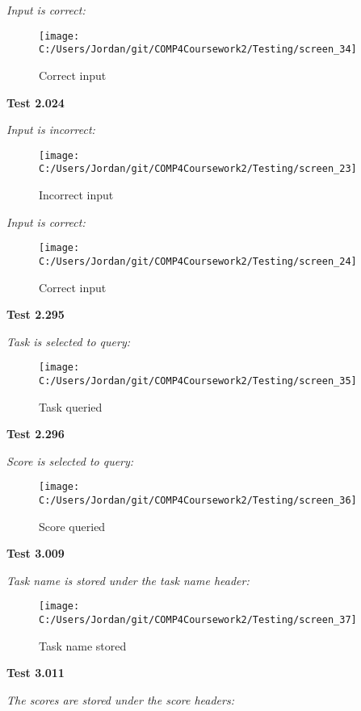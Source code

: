 \textit{Input is correct: }

\begin{figure}[H]
    \label{fig: Second Screen}\caption{Correct input}
    \texttt{[image: C:/Users/Jordan/git/COMP4Coursework2/Testing/screen\_34]}
\end{figure}

\textbf{Test 2.024}

\textit{Input is incorrect: }

\begin{figure}[H]
    \label{fig: Second Screen}\caption{Incorrect input}
    \texttt{[image: C:/Users/Jordan/git/COMP4Coursework2/Testing/screen\_23]}
\end{figure}

\textit{Input is correct: }

\begin{figure}[H]
    \label{fig: Second Screen}\caption{Correct input}
    \texttt{[image: C:/Users/Jordan/git/COMP4Coursework2/Testing/screen\_24]}
\end{figure}

\textbf{Test 2.295}

\textit{Task is selected to query: }

\begin{figure}[H]
    \label{fig: Second Screen}\caption{Task queried}
    \texttt{[image: C:/Users/Jordan/git/COMP4Coursework2/Testing/screen\_35]}
\end{figure}

\textbf{Test 2.296}

\textit{Score is selected to query: }

\begin{figure}[H]
    \label{fig: Second Screen}\caption{Score queried}
    \texttt{[image: C:/Users/Jordan/git/COMP4Coursework2/Testing/screen\_36]}
\end{figure}

\textbf{Test 3.009}

\textit{Task name is stored under the task name header: }

\begin{figure}[H]
    \label{fig: Second Screen}\caption{Task name stored}
    \texttt{[image: C:/Users/Jordan/git/COMP4Coursework2/Testing/screen\_37]}
\end{figure}

\textbf{Test 3.011}

\textit{The scores are stored under the score headers: }

